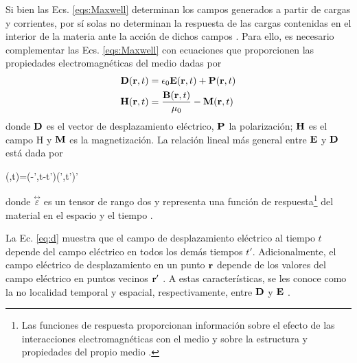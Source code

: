 \noindent Si bien las Ecs. \eqref{eqs:Maxwell} determinan los campos generados a partir de cargas y corrientes, por sí solas no determinan la respuesta de las cargas contenidas en el interior de la materia ante la acción de dichos campos \cite{novotnyPrinciplesNanooptics2012a}. Para ello, es necesario complementar las Ecs. \eqref{eqs:Maxwell} con ecuaciones que proporcionen las propiedades electromagnéticas del medio dadas por \cite{griffithsIntroductionElectrodynamics2023b}
%
\begin{align}
	\vb{D}(\vb{r},t)&=\epsilon_0\vb{E}(\vb{r},t)+\vb{P}(\vb{r},t)\\
	\vb{H}(\vb{r},t)&=\frac{\vb{B}(\vb{r},t)}{\mu_0}-\vb{M}(\vb{r},t)
\end{align}
%
donde $\vb{D}$ es el vector de desplazamiento eléctrico, $\vb{P}$ la polarización; $\vb{H}$ es el campo H y $\vb{M}$ es la magnetización. La relación lineal más general entre $\vb{E}$ y $\vb{D}$ está dada por \cite{jacksonClassicalElectrodynamics2021a}
%
\begin{tcolorbox}
	(,t)=\int\int\stackrel{\leftrightarrow}{\varepsilon}(-',t-t')\vdot{}(',t')'\
	\label{eq:d} 
\end{tcolorbox}
%	
\noindent donde $\stackrel{\leftrightarrow}{\varepsilon}$ es un tensor de rango dos y representa una función de respuesta\footnote{Las funciones de respuesta proporcionan información sobre el efecto de las interacciones electromagnéticas con el medio y sobre la estructura y propiedades del propio medio \cite{GeneralPropertiesElectromagnetic1989}.} del material en el espacio y el tiempo \cite{jacksonClassicalElectrodynamics2021a}.

\noindent La Ec. \eqref{eq:d} muestra que el campo de desplazamiento eléctrico al tiempo $t$ depende del campo eléctrico en todos los demás tiempos $t'$. Adicionalmente, el campo eléctrico de desplazamiento en un punto $\vb{r}$ depende de los valores del campo eléctrico en puntos vecinos $\vb{r}'$ \cite{jacksonClassicalElectrodynamics2021a}. A estas características, se les conoce como la no localidad temporal y espacial, respectivamente, entre $\vb{D}$ y $\vb{E}$ \cite{jacksonClassicalElectrodynamics2021a}.

